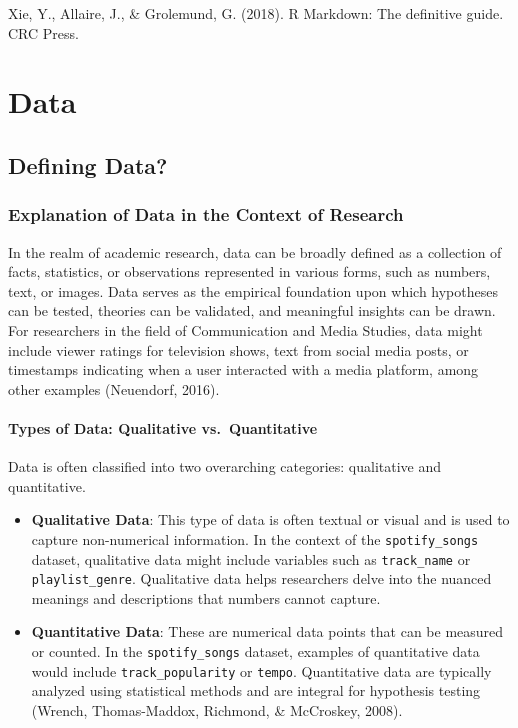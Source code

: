 \documentclass[
  b5paper]{book}
\begin{document}
Xie, Y., Allaire, J., \& Grolemund, G. (2018). R Markdown: The definitive guide. CRC Press.

\hypertarget{data}{%
\chapter{Data}\label{data}}

\hypertarget{defining-data}{%
\section{Defining Data?}\label{defining-data}}

\hypertarget{explanation-of-data-in-the-context-of-research}{%
\subsection*{Explanation of Data in the Context of Research}\label{explanation-of-data-in-the-context-of-research}}

In the realm of academic research, data can be broadly defined as a collection of facts, statistics, or observations represented in various forms, such as numbers, text, or images. Data serves as the empirical foundation upon which hypotheses can be tested, theories can be validated, and meaningful insights can be drawn. For researchers in the field of Communication and Media Studies, data might include viewer ratings for television shows, text from social media posts, or timestamps indicating when a user interacted with a media platform, among other examples (Neuendorf, 2016).

\hypertarget{types-of-data-qualitative-vs.-quantitative}{%
\subsubsection*{Types of Data: Qualitative vs.~Quantitative}\label{types-of-data-qualitative-vs.-quantitative}}

Data is often classified into two overarching categories: qualitative and quantitative.

\begin{itemize}
\item
  \textbf{Qualitative Data}: This type of data is often textual or visual and is used to capture non-numerical information. In the context of the \texttt{spotify\_songs} dataset, qualitative data might include variables such as \texttt{track\_name} or \texttt{playlist\_genre}. Qualitative data helps researchers delve into the nuanced meanings and descriptions that numbers cannot capture.
\item
  \textbf{Quantitative Data}: These are numerical data points that can be measured or counted. In the \texttt{spotify\_songs} dataset, examples of quantitative data would include \texttt{track\_popularity} or \texttt{tempo}. Quantitative data are typically analyzed using statistical methods and are integral for hypothesis testing (Wrench, Thomas-Maddox, Richmond, \& McCroskey, 2008).
\end{itemize}
\end{document}
